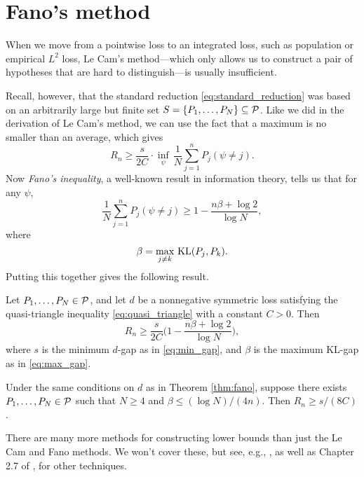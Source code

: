 \documentclass{article}
\begin{document}
\section{Fano's method}

When we move from a pointwise loss to an integrated loss, such as population or 
empirical $L^2$ loss, Le Cam's method---which only allows us to construct a pair  
of hypotheses that are hard to distinguish---is usually insufficient. 

Recall, however, that the standard reduction \eqref{eq:standard_reduction} was 
based on an arbitrarily large but finite set $S = \{P_1,\dots,P_N\} \subseteq
\mathcal{P}$. Like we did in the derivation of Le Cam's method, we can use the fact that
a maximum is no smaller than an average, which gives 
\[
R_n \geq \frac{s}{2C} \cdot \inf_\psi \, \frac{1}{N} \sum_{j=1}^n P_j (\psi 
\not= j). 
\]
Now \emph{Fano's inequality}, a well-known result in information theory, tells
us that for any $\psi$,  
\[
\frac{1}{N} \sum_{j=1}^n P_j (\psi \not= j) \geq 1 - \frac{n\beta + \log 2}{\log
  N}, 
\]
where 
\begin{equation}
\label{eq:max_gap}
\beta = \max_{j \not= k} \, \mathrm{KL}(P_j, P_k).
\end{equation}
Putting this together gives the following result.

\begin{theorem}
\label{thm:fano}
Let $P_1,\dots,P_N \in \mathcal{P}$, and let $d$ be a nonnegative symmetric loss
satisfying the quasi-triangle inequality \eqref{eq:quasi_triangle} with a
constant $C>0$. Then 
\begin{equation}
\label{eq:fano}
R_n \geq \frac{s}{2C} \bigg( 1 - \frac{n\beta + \log 2}{\log N} \bigg),
\end{equation}
where $s$ is the minimum $d$-gap as in \eqref{eq:min_gap}, and $\beta$ is the
maximum KL-gap as in \eqref{eq:max_gap}.
\end{theorem}

\begin{corollary}
\label{cor:fano}
Under the same conditions on $d$ as in Theorem \ref{thm:fano}, suppose there 
exists $P_1,\dots,P_N \in \mathcal{P}$ such that $N \geq 4$ and $\beta \leq (\log
N)/(4n)$. Then $R_n \geq s/(8C)$.
\end{corollary}

There are many more methods for constructing lower bounds than just the Le Cam
and Fano methods. We won't cover these, but see, e.g., \citet{yu1997assouad,
  yang1999information}, as well as Chapter 2.7 of
\citet{tsybakov2009introduction}, for other techniques. 
\end{document}
